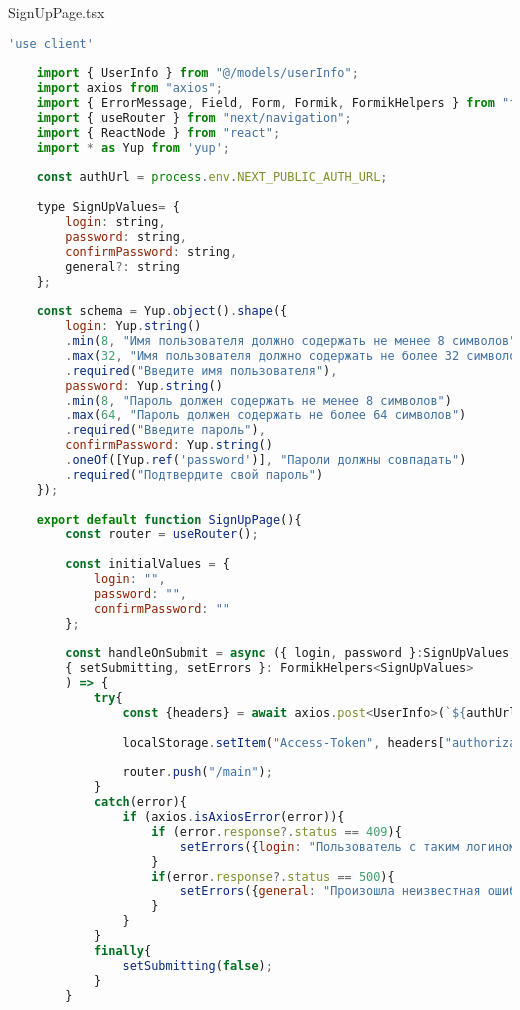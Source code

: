 SignUpPage.tsx
\begin{lstlisting}[language=javascript]
	'use client'
	
	import { UserInfo } from "@/models/userInfo";
	import axios from "axios";
	import { ErrorMessage, Field, Form, Formik, FormikHelpers } from "formik";
	import { useRouter } from "next/navigation";
	import { ReactNode } from "react";
	import * as Yup from 'yup';
	
	const authUrl = process.env.NEXT_PUBLIC_AUTH_URL;
	
	type SignUpValues= {
		login: string, 
		password: string,
		confirmPassword: string,
		general?: string
	};
	
	const schema = Yup.object().shape({
		login: Yup.string()
		.min(8, "Имя пользователя должно содержать не менее 8 символов")
		.max(32, "Имя пользователя должно содержать не более 32 символов")
		.required("Введите имя пользователя"),
		password: Yup.string()
		.min(8, "Пароль должен содержать не менее 8 символов")
		.max(64, "Пароль должен содержать не более 64 символов")
		.required("Введите пароль"),
		confirmPassword: Yup.string()
		.oneOf([Yup.ref('password')], "Пароли должны совпадать")
		.required("Подтвердите свой пароль")
	});
	
	export default function SignUpPage(){
		const router = useRouter();
		
		const initialValues = {
			login: "",
			password: "",
			confirmPassword: ""
		};
		
		const handleOnSubmit = async ({ login, password }:SignUpValues,
		{ setSubmitting, setErrors }: FormikHelpers<SignUpValues>
		) => {
			try{
				const {headers} = await axios.post<UserInfo>(`${authUrl}/Auth/signup`, {login, password})
				
				localStorage.setItem("Access-Token", headers["authorization"]);
				
				router.push("/main");
			}
			catch(error){
				if (axios.isAxiosError(error)){
					if (error.response?.status == 409){
						setErrors({login: "Пользователь с таким логином уже существует"})
					}
					if(error.response?.status == 500){
						setErrors({general: "Произошла неизвестная ошибка. Попробуйте еще раз"})
					}
				}
			}
			finally{
				setSubmitting(false);
			}
		}
		

\end{lstlisting}
